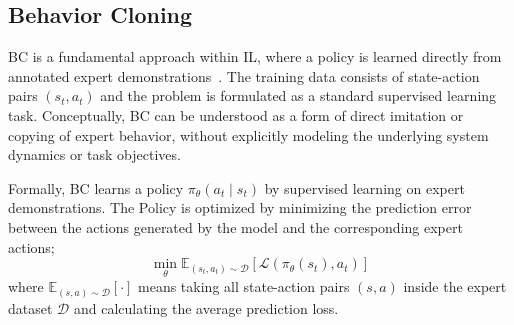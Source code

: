 \subsection{Behavior Cloning}
\label{sec:BehaviorCloning}
\ac{BC} is a fundamental approach within \ac{IL}, where a policy is learned directly from annotated expert demonstrations~\cite{Eze2024LearningBW}. The training data consists of state-action pairs $(s_t, a_t)$ and the problem is formulated as a standard supervised learning task.  
Conceptually, \ac{BC} can be understood as a form of direct imitation or copying of expert behavior, without explicitly modeling the underlying system dynamics or task objectives. 

Formally, \ac{BC} learns a policy $\pi_\theta(a_t \mid s_t)$ by supervised learning on expert demonstrations.
The Policy is optimized by minimizing the prediction error between the actions generated by the model and the corresponding expert actions;
\begin{equation}
	\min_{\theta} \mathbb{E}_{(s_t,a_t) \sim \mathcal{D}} \left[ \mathcal{L}(\pi_{\theta}(s_t), a_t) \right]
\end{equation}
where $\mathbb{E}_{(s,a) \sim \mathcal{D}} [\cdot]$ means taking all state-action pairs $(s, a)$ inside the expert dataset $\mathcal{D}$ and calculating the average prediction loss.
 







